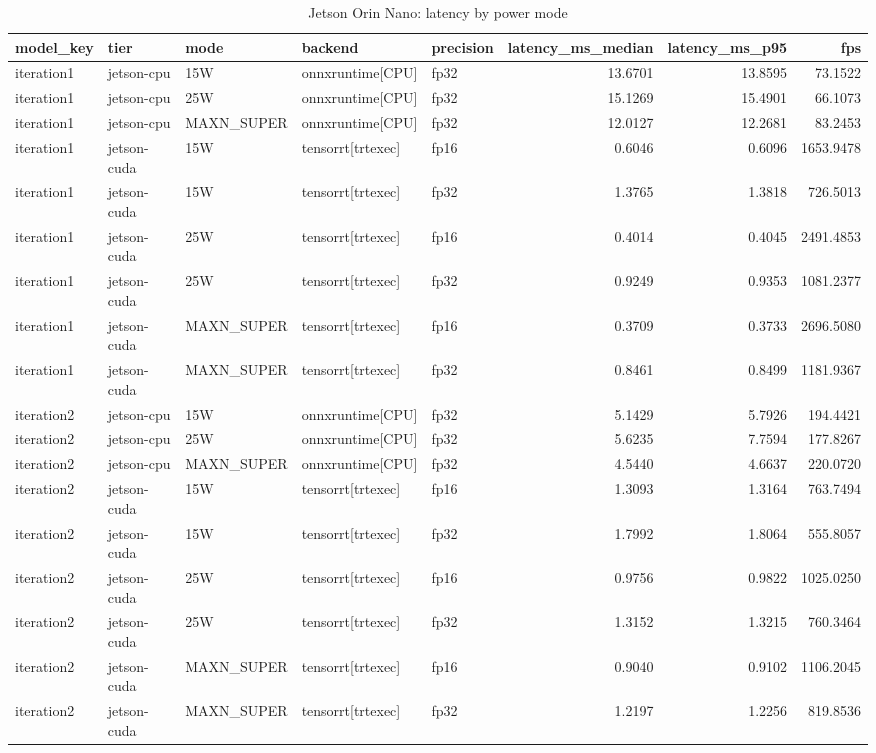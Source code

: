 \begin{table}
\caption{Jetson Orin Nano: latency by power mode}
\begin{tabular}{lllllrrr}
\toprule
model\_key & tier & mode & backend & precision & latency\_ms\_median & latency\_ms\_p95 & fps \\
\midrule
iteration1 & jetson-cpu & 15W & onnxruntime[CPU] & fp32 & 13.6701 & 13.8595 & 73.1522 \\
iteration1 & jetson-cpu & 25W & onnxruntime[CPU] & fp32 & 15.1269 & 15.4901 & 66.1073 \\
iteration1 & jetson-cpu & MAXN\_SUPER & onnxruntime[CPU] & fp32 & 12.0127 & 12.2681 & 83.2453 \\
iteration1 & jetson-cuda & 15W & tensorrt[trtexec] & fp16 & 0.6046 & 0.6096 & 1653.9478 \\
iteration1 & jetson-cuda & 15W & tensorrt[trtexec] & fp32 & 1.3765 & 1.3818 & 726.5013 \\
iteration1 & jetson-cuda & 25W & tensorrt[trtexec] & fp16 & 0.4014 & 0.4045 & 2491.4853 \\
iteration1 & jetson-cuda & 25W & tensorrt[trtexec] & fp32 & 0.9249 & 0.9353 & 1081.2377 \\
iteration1 & jetson-cuda & MAXN\_SUPER & tensorrt[trtexec] & fp16 & 0.3709 & 0.3733 & 2696.5080 \\
iteration1 & jetson-cuda & MAXN\_SUPER & tensorrt[trtexec] & fp32 & 0.8461 & 0.8499 & 1181.9367 \\
iteration2 & jetson-cpu & 15W & onnxruntime[CPU] & fp32 & 5.1429 & 5.7926 & 194.4421 \\
iteration2 & jetson-cpu & 25W & onnxruntime[CPU] & fp32 & 5.6235 & 7.7594 & 177.8267 \\
iteration2 & jetson-cpu & MAXN\_SUPER & onnxruntime[CPU] & fp32 & 4.5440 & 4.6637 & 220.0720 \\
iteration2 & jetson-cuda & 15W & tensorrt[trtexec] & fp16 & 1.3093 & 1.3164 & 763.7494 \\
iteration2 & jetson-cuda & 15W & tensorrt[trtexec] & fp32 & 1.7992 & 1.8064 & 555.8057 \\
iteration2 & jetson-cuda & 25W & tensorrt[trtexec] & fp16 & 0.9756 & 0.9822 & 1025.0250 \\
iteration2 & jetson-cuda & 25W & tensorrt[trtexec] & fp32 & 1.3152 & 1.3215 & 760.3464 \\
iteration2 & jetson-cuda & MAXN\_SUPER & tensorrt[trtexec] & fp16 & 0.9040 & 0.9102 & 1106.2045 \\
iteration2 & jetson-cuda & MAXN\_SUPER & tensorrt[trtexec] & fp32 & 1.2197 & 1.2256 & 819.8536 \\

\end{tabular}
\end{table}
